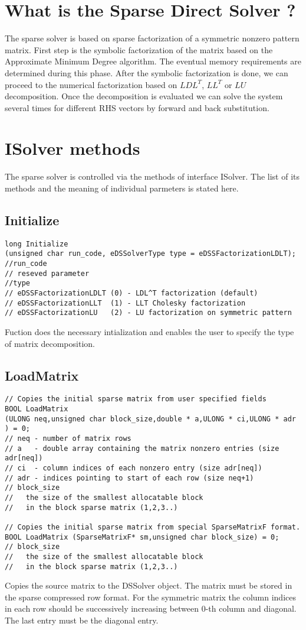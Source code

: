 \documentclass[12pt]{article}
\begin{document}
\section{What is the Sparse Direct Solver ?}

The sparse solver is based on sparse factorization of a symmetric nonzero pattern matrix. First step is the symbolic factorization of the matrix based on the Approximate Minimum Degree algorithm. The eventual memory requirements are determined during this phase. After the symbolic factorization is done, we can proceed to the numerical factorization based on $LDL^T$, $LL^T$ or $LU$ decomposition.
Once the decomposition is evaluated we can solve the system several times for different RHS vectors by forward and back substitution.

\section{ISolver methods}

The sparse solver is controlled via the methods of interface ISolver. The list of its methods and the meaning of individual parmeters is stated here.

\subsection{Initialize}
\begin{verbatim}
long Initialize
(unsigned char run_code, eDSSolverType type = eDSSFactorizationLDLT);
//run_code 
// reseved parameter
//type
// eDSSFactorizationLDLT (0) - LDL^T factorization (default)
// eDSSFactorizationLLT  (1) - LLT Cholesky factorization
// eDSSFactorizationLU   (2) - LU factorization on symmetric pattern
\end{verbatim}
Fuction does the necessary intialization and enables the user to specify the type of matrix decomposition.

\subsection{LoadMatrix}
\begin{verbatim}
// Copies the initial sparse matrix from user specified fields
BOOL LoadMatrix 
(ULONG neq,unsigned char block_size,double * a,ULONG * ci,ULONG * adr ) = 0;
// neq - number of matrix rows
// a   - double array containing the matrix nonzero entries (size adr[neq])
// ci  - column indices of each nonzero entry (size adr[neq])
// adr - indices pointing to start of each row (size neq+1)
// block_size
//   the size of the smallest allocatable block 
//	 in the block sparse matrix (1,2,3..)

// Copies the initial sparse matrix from special SparseMatrixF format.
BOOL LoadMatrix (SparseMatrixF* sm,unsigned char block_size) = 0;
// block_size
//   the size of the smallest allocatable block 
//	 in the block sparse matrix (1,2,3..)
\end{verbatim}
Copies the source matrix to the DSSolver object. The matrix must be stored in the sparse compressed row format. For the symmetric matrix the column indices in each row should be successively increasing between 0-th column and diagonal. The last entry must be the diagonal entry.
\end{document}
